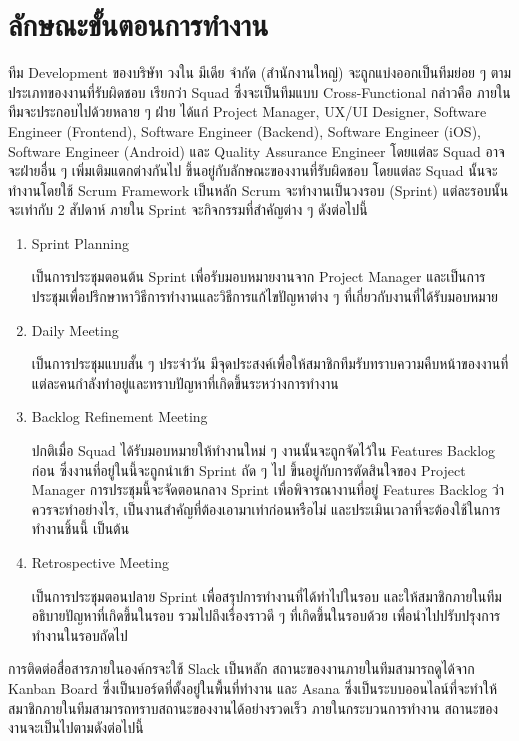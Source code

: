 \section{ลักษณะขั้นตอนการทำงาน}
ทีม Development ของบริษัท วงใน มีเดีย จำกัด (สำนักงานใหญ่) จะถูกแบ่งออกเป็นทีมย่อย ๆ ตามประเภทของงานที่รับผิดชอบ เรียกว่า Squad ซึ่งจะเป็นทีมแบบ Cross-Functional กล่าวคือ ภายในทีมจะประกอบไปด้วยหลาย ๆ ฝ่าย ได้แก่ Project Manager, UX/UI Designer, Software Engineer (Frontend), Software Engineer (Backend), Software Engineer (iOS), Software Engineer (Android) และ Quality Assurance Engineer โดยแต่ละ Squad อาจจะฝ่ายอื่น ๆ เพิ่มเติมแตกต่างกันไป ขึ้นอยู่กับลักษณะของงานที่รับผิดชอบ โดยแต่ละ Squad นั้นจะทำงานโดยใช้ Scrum Framework เป็นหลัก Scrum จะทำงานเป็นวงรอบ (Sprint) แต่ละรอบนั้นจะเท่ากับ 2 สัปดาห์ ภายใน Sprint จะกิจกรรมที่สำคัญต่าง ๆ ดังต่อไปนี้
\begin{enumerate}
	\item Sprint Planning
	
	เป็นการประชุมตอนต้น Sprint เพื่อรับมอบหมายงานจาก Project Manager และเป็นการประชุมเพื่อปรึกษาหาวิธีการทำงานและวิธีการแก้ไขปัญหาต่าง ๆ ที่เกี่ยวกับงานที่ได้รับมอบหมาย
	
	\item Daily Meeting
	
	เป็นการประชุมแบบสั้น ๆ ประจำวัน มีจุดประสงค์เพื่อให้สมาชิกทีมรับทราบความคืบหน้าของงานที่แต่ละคนกำลังทำอยู่และทราบปัญหาที่เกิดขึ้นระหว่างการทำงาน
	
	\item Backlog Refinement Meeting
	
	ปกติเมื่อ Squad ได้รับมอบหมายให้ทำงานใหม่ ๆ งานนั้นจะถูกจัดไว้ใน Features Backlog ก่อน ซึ่งงานที่อยู่ในนี้จะถูกนำเข้า Sprint ถัด ๆ ไป ขึ้นอยู่กับการตัดสินใจของ Project Manager การประชุมนี้จะจัดตอนกลาง Sprint เพื่อพิจารณางานที่อยู่ Features Backlog ว่าควรจะทำอย่างไร, เป็นงานสำคัญที่ต้องเอามาเท่าก่อนหรือไม่ และประเมินเวลาที่จะต้องใช้ในการทำงานชิ้นนี้ เป็นต้น
	
	\item Retrospective Meeting
	
	เป็นการประชุมตอนปลาย Sprint เพื่อสรุปการทำงานที่ได้ทำไปในรอบ และให้สมาชิกภายในทีมอธิบายปัญหาที่เกิดขึ้นในรอบ รวมไปถึงเรื่องราวดี ๆ ที่เกิดขึ้นในรอบด้วย เพื่อนำไปปรับปรุงการทำงานในรอบถัดไป
\end{enumerate}

การติดต่อสื่อสารภายในองค์กรจะใช้ Slack เป็นหลัก สถานะของงานภายในทีมสามารถดูได้จาก Kanban Board ซึ่งเป็นบอร์ดที่ตั้งอยู่ในพื้นที่ทำงาน และ Asana ซึ่งเป็นระบบออนไลน์ที่จะทำให้สมาชิกภายในทีมสามารถทราบสถานะของงานได้อย่างรวดเร็ว ภายในกระบวนการทำงาน สถานะของงานจะเป็นไปตามดังต่อไปนี้

